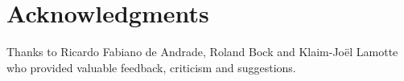 \section{Acknowledgments}

Thanks to Ricardo Fabiano de Andrade, Roland Bock and Klaim-Joël Lamotte who
provided valuable feedback, criticism and suggestions.
